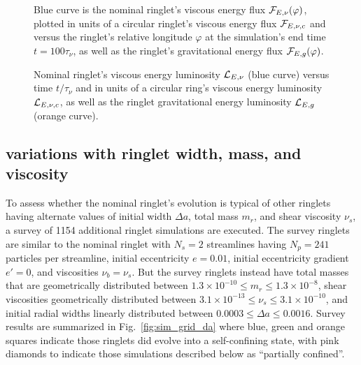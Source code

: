 \documentclass[preprint]{aastex62}
\begin{document}
\begin{figure}
    \caption{
        \label{fig:nominal_energy_flux}
        Blue curve is the nominal ringlet's viscous energy flux ${\cal F}_{E,\nu}(\varphi)$, plotted 
        in units of a circular ringlet's viscous energy flux ${\cal F}_{E,\nu,c}$ 
        and versus the ringlet's relative longitude $\varphi$ at the simulation's end time $t=100\tau_\nu$, 
        as well as the ringlet's gravitational energy flux ${\cal F}_{E,g}(\varphi)$.
    }
\end{figure}

\begin{figure}
    \caption{
        \label{fig:nominal_energy_luminosity}
        Nominal ringlet's viscous energy luminosity ${\cal L}_{E,\nu}$ (blue curve) versus time $t/\tau_\nu$
        and in units of a circular ring's viscous energy luminosity ${\cal L}_{E,\nu,c}$, 
        as well as the ringlet gravitational energy luminosity ${\cal L}_{E,g}$ (orange curve).
    }
\end{figure}


\subsection{variations with ringlet width, mass, and viscosity}
\label{subsec:variations}

To assess whether the nominal ringlet's evolution is typical of other ringlets
having alternate values of initial width $\Delta a$, total mass $m_r$, and shear viscosity $\nu_s$,
a survey of 1154 additional ringlet simulations are executed. 
The survey ringlets are similar to the nominal ringlet 
with $N_s=2$ streamlines having $N_p=241$ particles per streamline, initial 
eccentricity $e=0.01$, initial eccentricity gradient $e'=0$, and viscosities $\nu_b=\nu_s$. 
But the survey ringlets instead have
total masses that are geometrically distributed between $1.3\times10^{-10}\le m_r\le1.3\times10^{-8}$,
shear viscosities geometrically distributed 
between $3.1\times10^{-13}\le \nu_s\le3.1\times10^{-10}$,
and initial radial widths linearly distributed between  
$0.0003\le \Delta a\le0.0016$. Survey results are summarized in Fig.\ \ref{fig:sim_grid_da}
where blue, green and orange squares indicate those ringlets did evolve into a self-confining state,
with pink diamonds to indicate those simulations described below as ``partially confined''.
\end{document}
